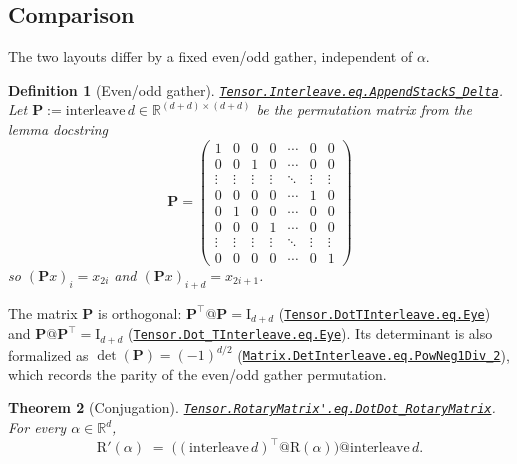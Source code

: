 \documentclass[11pt,a4paper]{article}
\newcommand{\lmod}[1]{\href{http://www.lemma.cn/lean/?module=#1}{\nolinkurl{#1}}}
\newtheorem{theorem}{Theorem}[section]
\newtheorem{definition}[theorem]{Definition}
\newcommand{\R}{\mathbb{R}}
\newcommand{\rot}{\mathrm{R}}
\newcommand{\eye}{\mathrm{I}}
\begin{document}
\subsection{Comparison}
\label{sec:compare}

The two layouts differ by a fixed even/odd gather, independent of \(\alpha\).

\begin{definition}[Even/odd gather]
\label{def:P}
\lmod{Tensor.Interleave.eq.AppendStackS_Delta}.
Let \(\boldsymbol{P}:=\mathrm{interleave}\,d\in\R^{(d+d)\times(d+d)}\) be the permutation matrix from the lemma docstring
\begin{equation}
\label{eq:P}
{\boldsymbol{P}}=\begin{pmatrix}
1 & 0 & 0 & 0 & \cdots & 0 & 0 \\
0 & 0 & 1 & 0 & \cdots & 0 & 0 \\
\vdots & \vdots & \vdots & \vdots & \ddots & \vdots & \vdots \\
0 & 0 & 0 & 0 & \cdots & 1 & 0 \\
0 & 1 & 0 & 0 & \cdots & 0 & 0 \\
0 & 0 & 0 & 1 & \cdots & 0 & 0 \\
\vdots & \vdots & \vdots & \vdots & \ddots & \vdots & \vdots \\
0 & 0 & 0 & 0 & \cdots & 0 & 1
\end{pmatrix}
\end{equation}
so \((\boldsymbol{P}x)_i=x_{2i}\) and \((\boldsymbol{P}x)_{i+d}=x_{2i+1}\).
\end{definition}

The matrix \(\boldsymbol{P}\) is orthogonal:
\(\boldsymbol{P}^\top@\boldsymbol{P}=\eye_{d+d}\)
(\lmod{Tensor.DotTInterleave.eq.Eye})
and
\(\boldsymbol{P}@\boldsymbol{P}^\top=\eye_{d+d}\)
(\lmod{Tensor.Dot_TInterleave.eq.Eye}).
Its determinant is also formalized as
\(\det(\boldsymbol{P})=(-1)^{d/2}\)
(\lmod{Matrix.DetInterleave.eq.PowNeg1Div_2}),
which records the parity of the even/odd gather permutation.

\begin{theorem}[Conjugation]
\label{thm:conj}
\lmod{Tensor.RotaryMatrix'.eq.DotDot_RotaryMatrix}.
For every \(\alpha\in\R^d\),
\begin{equation}
  \label{eq:conj}
  \rot'(\alpha)
  \;=\;
  \bigl((\mathrm{interleave}\,d)^\top @ \rot(\alpha)\bigr) @ \mathrm{interleave}\,d.
\end{equation}
\end{theorem}
\end{document}
